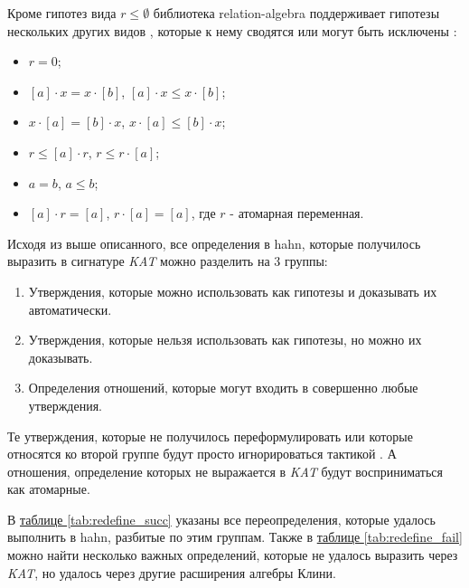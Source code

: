 \documentclass[times
              ,specification
              ,annotation
              ]{itmo-student-thesis}
\begin{document}
      Кроме гипотез вида $r \leq \emptyset$ библиотека relation-algebra поддерживает гипотезы нескольких других
      видов \cite{kat}, которые к нему сводятся или могут быть исключены \cite{hkat,hkat_cpc}:
      \begin{itemize}
        \item $ r = 0 $;
        \item $[a] \cdot x = x \cdot [b]$, $[a] \cdot x \leq x \cdot [b]$;
        \item $x \cdot [a] = [b] \cdot x$, $x \cdot [a] \leq [b] \cdot x$;
        \item $ r \leq [a] \cdot r $, $ r \leq r \cdot [a]$;
        \item $ a = b $, $ a \leq b $;
        \item $[a] \cdot r = [a]$, $r \cdot [a] = [a]$, где $r$ - атомарная переменная.
      \end{itemize}

      Исходя из выше описанного, все определения в hahn, которые получилось выразить в сигнатуре
      \textit{KAT} можно разделить на 3 группы:
      \begin{enumerate}
        \item Утверждения, которые можно использовать как гипотезы и доказывать их автоматически.
        \item Утверждения, которые нельзя использовать как гипотезы, но можно их доказывать.
        \item Определения отношений, которые могут входить в совершенно любые утверждения.
      \end{enumerate}

      Те утверждения, которые не получилось переформулировать или которые относятся ко второй группе будут
      просто игнорироваться тактикой . А отношения, определение которых не выражается в
      \textit{KAT} будут восприниматься как атомарные. 
      
      В \hyperref[tab:redefine_succ]{таблице \ref{tab:redefine_succ}} указаны все переопределения,
      которые удалось выполнить в hahn, разбитые по этим группам.
      Также в \hyperref[tab:redefine_fail]{таблице \ref{tab:redefine_fail}} можно найти несколько
      важных определений, которые не удалось выразить через \textit{KAT},
      но удалось через другие расширения алгебры Клини.
\end{document}
